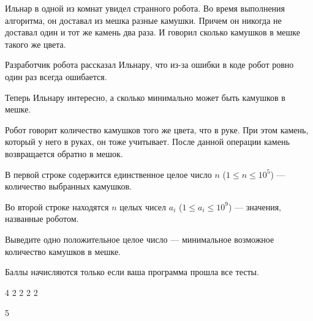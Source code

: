 
Ильнар в одной из комнат увидел странного робота. Во время выполнения алгоритма, он доставал из мешка разные камушки. 
Причем он никогда не доставал один и тот же камень два раза. И говорил сколько камушков в мешке такого же цвета.

Разработчик робота рассказал Ильнару, что из-за ошибки в коде робот ровно один раз всегда ошибается.

Теперь Ильнару интересно, а сколько минимально может быть камушков в мешке.

\explaneSection

Робот говорит количество камушков того же цвета, что в руке. При этом камень, который у него в руках, он тоже учитывает. После данной операции камень возвращается обратно в мешок.


В первой строке содержится единственное целое число $n$ ($1 \leq n \leq 10^5$) — количество выбранных камушков.

Во второй строке находятся $n$ целых чисел $a_i$ ($1 \leq a_i \leq 10^9$) — значения, названные роботом.

\outputfmtSection

Выведите одно положительное целое число — минимальное возможное количество камушков в мешке.

\markSection

Баллы начисляются только если ваша программа прошла все тесты.


\begin{myverbbox}[\small]{\vinput}
    4
    2 2 2 2
\end{myverbbox}
\begin{myverbbox}[\small]{\voutput}
    5
\end{myverbbox}

